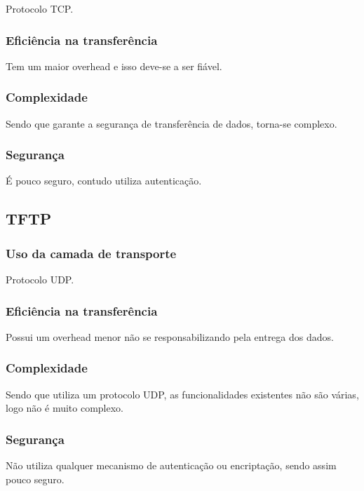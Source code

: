 \documentclass[a4paper]{report}
\begin{document}
Protocolo TCP.

\subsubsection{Eficiência na transferência}

Tem um maior overhead e isso deve-se a ser fiável.

\subsubsection{Complexidade}

Sendo que garante a segurança de transferência de dados, torna-se complexo.

\subsubsection{Segurança}

É pouco seguro, contudo utiliza autenticação.

\subsection{TFTP}

\subsubsection{Uso da camada de transporte}

Protocolo UDP.

\subsubsection{Eficiência na transferência}

Possui um overhead menor não se responsabilizando pela entrega dos dados.

\subsubsection{Complexidade}

Sendo que utiliza um protocolo UDP, as funcionalidades existentes não são várias, logo não é muito complexo.

\subsubsection{Segurança}

Não utiliza qualquer mecanismo de autenticação ou encriptação, sendo assim pouco seguro.
\end{document}
